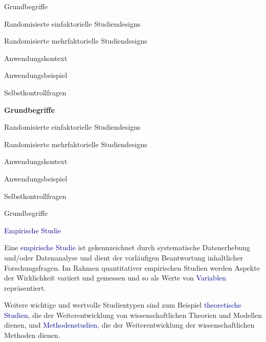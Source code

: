 \documentclass[
  8pt,
  ignorenonframetext,
]{beamer}
\begin{document}
\begin{frame}[plain]{}
\protect\hypertarget{section-2}{}
\vfill
\large
{}

Grundbegriffe

Randomisierte einfaktorielle Studiendesigns

Randomisierte mehrfaktorielle Studiendesigns

Anwendungskontext

Anwendungsbeispiel

Selbstkontrollfragen \vfill
\end{frame}

\begin{frame}[plain]{}
\protect\hypertarget{section-3}{}
\vfill
\large
{}

\textbf{Grundbegriffe}

Randomisierte einfaktorielle Studiendesigns

Randomisierte mehrfaktorielle Studiendesigns

Anwendungskontext

Anwendungsbeispiel

Selbstkontrollfragen \vfill
\end{frame}

\begin{frame}{Grundbegriffe}
\protect\hypertarget{grundbegriffe}{}
\large

\textcolor{darkblue}{Empirische Studie} \normalsize

Eine \textcolor{darkblue}{empirische Studie} ist gekennzeichnet durch
systematische Datenerhebung und/oder Datenanalyse und dient der
vorläufigen Beantwortung inhaltlicher Forschungsfragen. Im Rahmen
quantitativer empirischen Studien werden Aspekte der Wirklichkeit
variiert und gemessen und so als Werte von
\textcolor{darkblue}{Variablen} repräsentiert.

\vspace{2mm}

Weitere wichtige und wertvolle Studientypen sind zum Beispiel
\textcolor{darkblue}{theoretische Studien}, die der Weiterentwicklung
von wissenschaftlichen Theorien und Modellen dienen, und
\textcolor{darkblue}{Methodenstudien}, die der Weiterentwicklung der
wissenschaftlichen Methoden dienen.
\end{frame}
\end{document}
